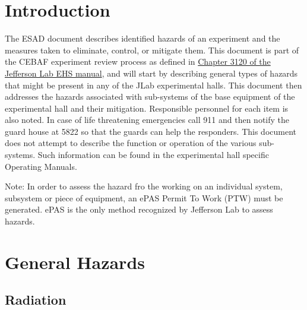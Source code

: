 
%
%
%

\chapter{Introduction}

The ESAD document describes identified hazards of an experiment and the measures taken to eliminate, control, or mitigate them.
This document is part of the CEBAF experiment review process as defined in
\href{http://www.jlab.org/ehs/ehsmanual/manual/3120.html}{Chapter 3120 of the Jefferson Lab EHS manual},
and will start by describing general types of hazards that might be present in any of the  
JLab experimental halls.  This document then addresses the hazards associated 
with sub-systems of the base equipment of the experimental hall and their 
mitigation.  Responsible personnel for each item is also noted.  
In case of life threatening 
emergencies call 911 and then notify the guard house at 5822 so that the guards can help
the responders.  This document does not attempt to describe the function 
or operation of the various sub-systems. Such information can be found in
the experimental hall specific Operating Manuals.

Note:
In order to assess the hazard fro the working on an individual system, subsystem or piece of equipment, an ePAS Permit To Work (PTW) must be generated. ePAS is the only method recognized by Jefferson Lab to assess hazards.


\chapter{General Hazards}
\label{chap:generalhazards}
\section{Radiation}
	
